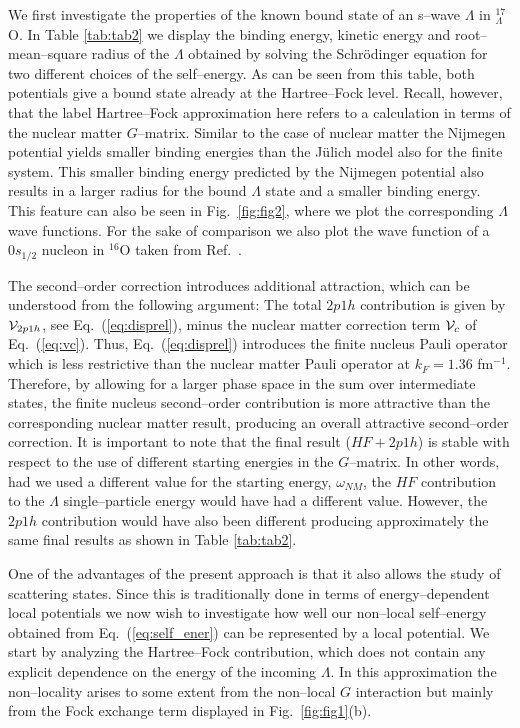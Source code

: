 We first investigate the properties of the known bound state
of an s--wave  $\Lambda$ in $^{17}_{\Lambda}$O.
In Table \ref{tab:tab2} we display
the binding energy, kinetic energy and root--mean--square radius of the
$\Lambda$ obtained by solving the Schr\"odinger equation for two
different choices of the self--energy. As can be seen from this table,
both potentials give a bound state already
at the Hartree--Fock level. Recall, however, that the label
Hartree--Fock approximation here refers to a calculation in terms of
the nuclear matter $G$--matrix. Similar to the case of nuclear matter
the Nijmegen potential yields smaller binding energies than the
J\"ulich model also for the finite system. This smaller binding energy
predicted by the Nijmegen potential also results in a larger radius for
the bound $\Lambda$ state and a smaller binding energy.
This feature can also
be seen in Fig.\ \ref{fig:fig2}, where we plot the corresponding
$\Lambda$ wave functions. For the sake of comparison we also
plot the wave function of a $0s_{1/2}$ nucleon in
$^{16}$O taken from Ref.\  \cite{hbmp93}.

The second--order correction introduces additional attraction, which
can be understood from the following argument:
The total $2p1h$ contribution is given by ${\cal V}_{2p1h}$, see
Eq.\ (\ref{eq:disprel}),
minus the nuclear matter correction term ${\cal V}_c$
of Eq.\ (\ref{eq:vc}).
Thus, Eq.\ (\ref{eq:disprel}) 
introduces the finite nucleus
Pauli operator which is less restrictive than the nuclear matter
Pauli operator at $k_F=1.36$ fm$^{-1}$.
Therefore, by allowing for a larger phase
space in the sum over intermediate
states, the finite nucleus second--order contribution
is more attractive than the corresponding nuclear matter result,
producing an overall attractive second--order correction.
It is important to note that 
the final result ($HF+2p1h$) is  stable with respect to the use of
different starting energies
in the $G$--matrix. In other words, had we used a different value
for the starting energy, $\omega_{NM}$, the $HF$ contribution to
the $\Lambda$ single--particle energy would have had a different
value. However,
the $2p1h$ contribution would have also been different producing
approximately the same final results as shown in Table \ref{tab:tab2}.


One of the advantages
of the present approach is that it also allows the study of
scattering states. Since this is
traditionally
done in terms of energy--dependent local potentials
we now wish to investigate
how well our non--local self--energy obtained
from Eq.\ (\ref{eq:self_ener}) can
be represented by a local potential.
We start by analyzing the Hartree--Fock
contribution, which does not contain any explicit dependence on the energy
of the incoming $\Lambda$. In this approximation the non--locality
arises to some extent from the non--local $G$ interaction but mainly
from the Fock exchange term displayed in Fig.\ \ref{fig:fig1}(b).


